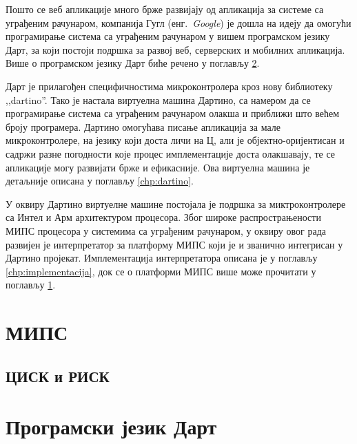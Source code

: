\documentclass[12pt,oneside]{memoir}
\begin{document}
Пошто се веб апликације много брже развијају од апликација за системе са уграђеним рачунаром, компанија Гугл (енг.~\textit{Google}) је дошла на идеју да омогући програмирање система са уграђеним рачунаром у вишем програмском језику Дарт, за који постоји подршка за развој веб, серверских и мобилних апликација. Више о програмском језику Дарт биће речено у поглављу \ref{chp:dart}.

Дарт је прилагођен специфичностима микроконтролера кроз нову библиотеку ,,dartino''. Тако је настала виртуелна машина Дартино, са намером да се програмирање система са уграђеним рачунаром олакша и приближи што већем броју програмера. Дартино омогућава писање апликација за мале микроконтролере, на језику који доста личи на Ц, али је објектно-оријентисан и садржи разне погодности које процес имплементације доста олакшавају, те се апликације могу развијати брже и ефикасније. Ова виртуелна машина је детаљније описана у поглављу \ref{chp:dartino}.

У оквиру Дартино виртуелне машине постојала је подршка за миктроконтролере са Интел и Арм архитектуром процесора. Због широке распрострањености МИПС процесора у системима са уграђеним рачунаром, у оквиру овог рада развијен је интерпретатор за платформу МИПС који је и званично интегрисан у Дартино пројекат. Имплементација интерпретатора описана је у поглављу \ref{chp:implementacija}, док се о платформи МИПС више може прочитати у поглављу \ref{chp:mips}.\\




\chapter{МИПС}
\label{chp:mips}

\section{ЦИСК и РИСК}



\chapter{Програмски језик Дарт}
\label{chp:dart}
\end{document}
